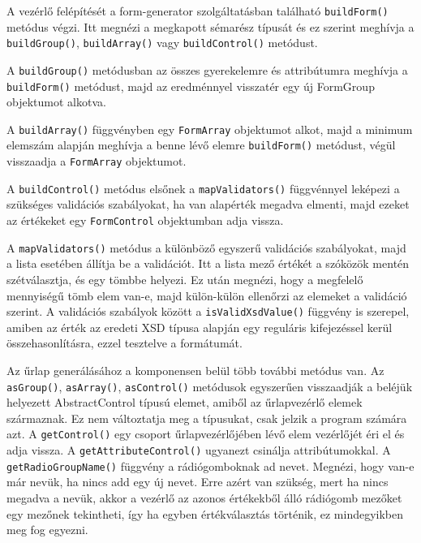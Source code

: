 A vezérlő felépítését a form-generator szolgáltatásban található \texttt{buildForm()} metódus végzi. Itt megnézi a megkapott sémarész típusát és ez szerint meghívja a \\ \texttt{buildGroup()}, \texttt{buildArray()} vagy \texttt{buildControl()} metódust.

A \texttt{buildGroup()} metódusban az összes gyerekelemre és attribútumra meghívja a \texttt{buildForm()} metódust, majd az eredménnyel visszatér egy új FormGroup objektumot alkotva.

A \texttt{buildArray()} függvényben egy \texttt{FormArray} objektumot alkot, majd a minimum elemszám alapján meghívja a benne lévő elemre \texttt{buildForm()} metódust, végül visszaadja a \texttt{FormArray} objektumot.

A \texttt{buildControl()} metódus elsőnek a \texttt{mapValidators()} függvénnyel leképezi a szükséges validációs szabályokat, ha van alapérték megadva elmenti, majd ezeket az értékeket egy \texttt{FormControl} objektumban adja vissza.

A \texttt{mapValidators()} metódus a különböző egyszerű validációs szabályokat, majd a lista esetében állítja be a validációt. Itt a lista mező értékét a szóközök mentén szétválasztja, és egy tömbbe helyezi. Ez után megnézi, hogy a megfelelő mennyiségű tömb elem van-e, majd külön-külön ellenőrzi az elemeket a validáció szerint. A validációs szabályok között a \texttt{isValidXsdValue()} függvény is szerepel, amiben az érték az eredeti XSD típusa alapján egy reguláris kifejezéssel kerül összehasonlításra, ezzel tesztelve a formátumát.


Az űrlap generálásához a komponensen belül több további metódus van. Az \texttt{asGroup()}, \texttt{asArray()}, \texttt{asControl()} metódusok egyszerűen visszaadják a beléjük helyezett AbstractControl típusú elemet, amiből az űrlapvezérlő elemek származnak. Ez nem változtatja meg a típusukat, csak jelzik a program számára azt.
A \texttt{getControl()} egy csoport űrlapvezérlőjében lévő elem vezérlőjét éri el és adja vissza. A \texttt{getAttributeControl()} ugyanezt csinálja attribútumokkal.
A \texttt{getRadioGroupName()} függvény a rádiógomboknak ad nevet. Megnézi, hogy van-e már nevük, ha nincs add egy új nevet. Erre azért van szükség, mert ha nincs megadva a nevük, akkor a vezérlő az azonos értékekből álló rádiógomb mezőket egy mezőnek tekintheti, így ha egyben értékválasztás történik, ez mindegyikben meg fog egyezni.

